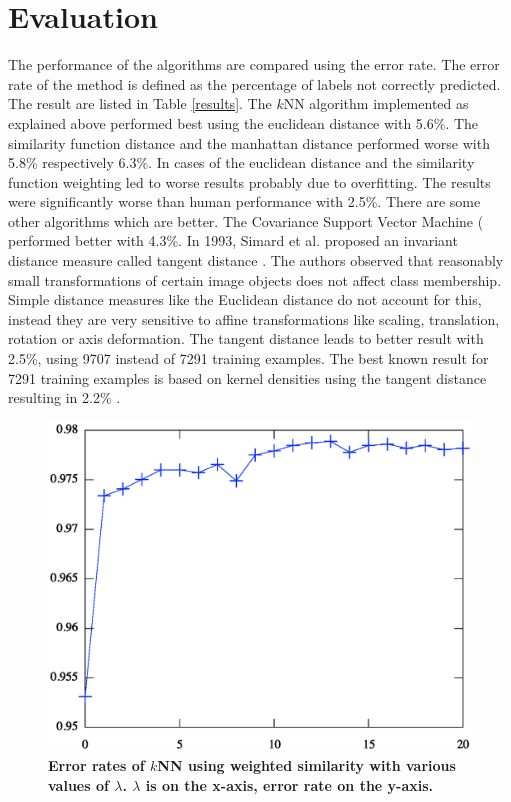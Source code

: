 \documentclass[10pt,twocolumn,letterpaper]{article}
\begin{document}
\section{Evaluation}
The performance of the algorithms are compared using the error rate. The error rate of the method is defined as the percentage of labels not correctly predicted. The result are listed in Table \ref{results}. The $k$NN algorithm implemented as explained above performed best using the euclidean distance with 5.6\%. The similarity function distance and the manhattan distance performed worse with 5.8\% respectively 6.3\%. In cases of the euclidean distance and the similarity function weighting led to worse results probably due to overfitting. The results were significantly worse than human performance with 2.5\%. There are some other algorithms which are better. The Covariance Support Vector Machine (\cite{shivas} performed better with 4.3\%. In 1993, Simard et al. proposed an invariant distance measure called tangent distance \cite{Simard}. The authors observed that reasonably small transformations of certain image objects does not affect class membership. Simple distance measures like the Euclidean distance do not account for this, instead they are very sensitive to affine transformations like scaling, translation, rotation or axis deformation. The tangent distance leads to better result with 2.5\%, using 9707 instead of 7291 training examples. The best known result for 7291 training examples is based on kernel densities using the tangent distance resulting in 2.2\% \cite{keysers}.   


\begin{figure}[htbp]
\begin{center}
\includegraphics[scale=.5]{weightedSimilarityAccuracy}
\caption{{\bf Error rates of $k$NN using weighted similarity with various values of $\lambda$. $\lambda$ is on the x-axis, error rate on the y-axis.}}
\label{fig:lambda}
\end{center}
\end{figure}
\end{document}

